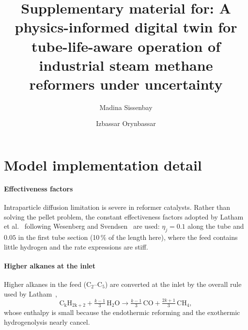 \documentclass[final,3p,times]{elsarticle}
\newcommand{\ce}[1]{\mathrm{#1}}
\begin{document}
\begin{frontmatter}
\title{Supplementary material for: A physics-informed digital twin for tube-life-aware operation of industrial steam methane reformers under uncertainty}
\author[au]{Madina Sissenbay}
\author[su]{Izbassar Orynbassar}
\end{frontmatter}

\section{Model implementation detail}
\label{sec:modeldetail}

\paragraph{Effectiveness factors} Intraparticle diffusion limitation is severe in reformer catalysts. Rather than solving the pellet problem, the constant effectiveness factors adopted by Latham et al.~\cite{latham2011} following Wesenberg and Svendsen~\cite{wesenberg2007} are used: $\eta_j = 0.1$ along the tube and $0.05$ in the first tube section (10\,\% of the length here), where the feed contains little hydrogen and the rate expressions are stiff.

\paragraph{Higher alkanes at the inlet} Higher alkanes in the feed (C$_2$--C$_5$) are converted at the inlet by the overall rule used by Latham~\cite{latham2011},
\begin{equation}
\ce{C_kH_{2k+2}} + \tfrac{k-1}{3}\,\ce{H_2O} \rightarrow \tfrac{k-1}{3}\,\ce{CO} + \tfrac{2k+1}{3}\,\ce{CH_4},
\label{eq:alkane}
\end{equation}
whose enthalpy is small because the endothermic reforming and the exothermic hydrogenolysis nearly cancel.
\end{document}
